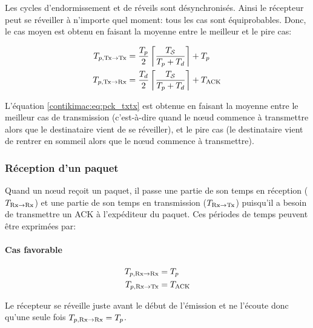 Les cycles d'endormissement et de réveils sont désynchronisés.
Ainsi le récepteur peut se réveiller à n'importe quel moment: tous les cas sont équiprobables.
Donc, le cas moyen est obtenu en faisant la moyenne entre le meilleur et le pire cas:

\begin{align}
  T_{p, \textrm{Tx} \to \textrm{Tx}} &=  \frac{T_p}{2} \left\lceil \frac{T_{\mathcal{S}}}{T_p + T_d}\right\rceil + T_p
  \label{contikimac:eq:pck_txtx} \\
  T_{p, \textrm{Tx} \to \textrm{Rx}} &= \frac{T_d}{2} \left \lceil \dfrac{T_{\mathcal{S}}}{T_p + T_d} \right \rceil + T_{\textrm{ACK}}
  \label{contikimac:eq:pck_txrx}
\end{align}

L'équation \eqref{contikimac:eq:pck_txtx} est obtenue en faisant la moyenne entre le meilleur cas de transmission (c'est-à-dire quand le  nœud commence à transmettre alors que le destinataire vient de se réveiller), et le pire cas (le destinataire vient de rentrer en sommeil alors que le nœud commence à transmettre).

\subsubsection{Réception d'un paquet}
\label{contikimac:reception}

Quand un nœud reçoit un paquet, il passe une partie de son temps en réception ($T_{\textrm{Rx} \to \textrm{Rx}}$) et une partie de son temps en transmission ($T_{\textrm{Rx} \to \textrm{Tx}}$) puisqu'il a besoin de transmettre  un \ac{ACK} à l'expéditeur du paquet.
Ces périodes de temps peuvent être  exprimées par:

\paragraph{Cas favorable}

\begin{align}
  T_{p, \textrm{Rx} \to \textrm{Rx}} &= T_p
  \label{contikimac:eq:pck_rxrx_best} \\
  T_{p, \textrm{Rx} \to \textrm{Tx}} &= T_{\textrm{ACK}}
  \label{contikimac:eq:pck_rxtx_best}
\end{align}

Le récepteur se réveille juste avant le début de l'émission et ne l'écoute donc qu'une seule fois $T_{p, \textrm{Rx} \to \textrm{Rx}} = T_p$.

